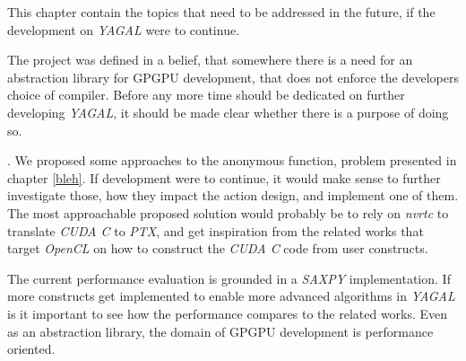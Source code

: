 This chapter contain the topics that need to be addressed in the future, if the development on \textit{YAGAL} were to continue.

The project was defined in a belief, that somewhere there is a need for an abstraction library for GPGPU development, that does not enforce the developers choice of compiler. Before any more time should be dedicated on further developing \textit{YAGAL}, it should be made clear whether there is a purpose of doing so.

.
We proposed some approaches to the anonymous function, problem presented in chapter \ref{bleh}. If development were to continue, it would make sense to further investigate those, how they impact the action design, and implement one of them. The most approachable proposed solution would probably be to rely on \textit{nvrtc} to translate \textit{CUDA C} to \textit{PTX}, and get inspiration from the related works that target \textit{OpenCL} on how to construct the \textit{CUDA C} code from user constructs.

The current performance evaluation is grounded in a \textit{SAXPY} implementation. If more constructs get implemented to enable more advanced algorithms in \textit{YAGAL} is it important to see how the performance compares to the related works. Even as an abstraction library, the domain of GPGPU development is  performance oriented.